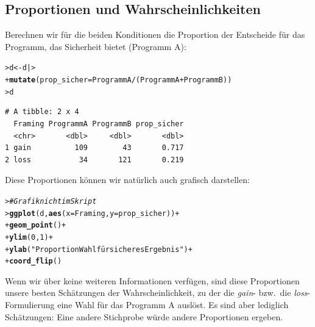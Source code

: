 \documentclass[oneside, 10pt]{book}\usepackage[]{graphicx}\usepackage[]{xcolor}
\makeatletter
\newcommand{\hlnum}[1]{\textcolor[rgb]{0.686,0.059,0.569}{#1}}%
\newcommand{\hlstr}[1]{\textcolor[rgb]{0.192,0.494,0.8}{#1}}%
\newcommand{\hlcom}[1]{\textcolor[rgb]{0.678,0.584,0.686}{\textit{#1}}}%
\newcommand{\hlopt}[1]{\textcolor[rgb]{0,0,0}{#1}}%
\newcommand{\hlstd}[1]{\textcolor[rgb]{0.345,0.345,0.345}{#1}}%
\newcommand{\hlkwb}[1]{\textcolor[rgb]{0.69,0.353,0.396}{#1}}%
\newcommand{\hlkwc}[1]{\textcolor[rgb]{0.333,0.667,0.333}{#1}}%
\newcommand{\hlkwd}[1]{\textcolor[rgb]{0.737,0.353,0.396}{\textbf{#1}}}%
\newenvironment{kframe}{%
 \def\at@end@of@kframe{}%
 \ifinner\ifhmode%
  \def\at@end@of@kframe{\end{minipage}}%
  \begin{minipage}{\columnwidth}%
 \fi\fi%
 \def\FrameCommand##1{\hskip\@totalleftmargin \hskip-\fboxsep
 \colorbox{shadecolor}{##1}\hskip-\fboxsep
     \hskip-\linewidth \hskip-\@totalleftmargin \hskip\columnwidth}%
 \MakeFramed {\advance\hsize-\width
   \@totalleftmargin\z@ \linewidth\hsize
   \@setminipage}}%
 {\par\unskip\endMakeFramed%
 \at@end@of@kframe}
\newenvironment{knitrout}{}{} %
\makeatother
\begin{document}
\subsection{Proportionen und Wahrscheinlichkeiten}
Berechnen wir für die beiden Konditionen
die Proportion der Entscheide
für das Programm, das Sicherheit bietet (Programm A):
\begin{knitrout}
\color{fgcolor}\begin{kframe}
\begin{alltt}
\hlstd{> }\hlstd{d} \hlkwb{<-} \hlstd{d |>}
\hlstd{+ }  \hlkwd{mutate}\hlstd{(}\hlkwc{prop_sicher} \hlstd{= ProgrammA} \hlopt{/} \hlstd{(ProgrammA} \hlopt{+} \hlstd{ProgrammB))}
\hlstd{> }\hlstd{d}
\end{alltt}
\begin{verbatim}
# A tibble: 2 x 4
  Framing ProgrammA ProgrammB prop_sicher
  <chr>       <dbl>     <dbl>       <dbl>
1 gain          109        43       0.717
2 loss           34       121       0.219
\end{verbatim}
\end{kframe}
\end{knitrout}

Diese Proportionen können wir natürlich auch grafisch darstellen:
\begin{knitrout}
\color{fgcolor}\begin{kframe}
\begin{alltt}
\hlstd{> }\hlcom{# Grafik nicht im Skript}
\hlstd{> }\hlkwd{ggplot}\hlstd{(d,} \hlkwd{aes}\hlstd{(}\hlkwc{x} \hlstd{= Framing,} \hlkwc{y} \hlstd{= prop_sicher))} \hlopt{+}
\hlstd{+ }  \hlkwd{geom_point}\hlstd{()} \hlopt{+}
\hlstd{+ }  \hlkwd{ylim}\hlstd{(}\hlnum{0}\hlstd{,} \hlnum{1}\hlstd{)} \hlopt{+}
\hlstd{+ }  \hlkwd{ylab}\hlstd{(}\hlstr{"Proportion Wahl für sicheres Ergebnis"}\hlstd{)} \hlopt{+}
\hlstd{+ }  \hlkwd{coord_flip}\hlstd{()}
\end{alltt}
\end{kframe}
\end{knitrout}

Wenn wir über keine weiteren Informationen verfügen,
sind diese Proportionen unsere besten Schätzungen
der Wahrscheinlichkeit, zu der die \textit{gain}-
bzw.\ die \textit{loss}-Formulierung eine Wahl
für das Programm A auslöst. Es sind aber lediglich
Schätzungen: Eine andere Stichprobe würde andere
Proportionen ergeben.
 
\end{document}
